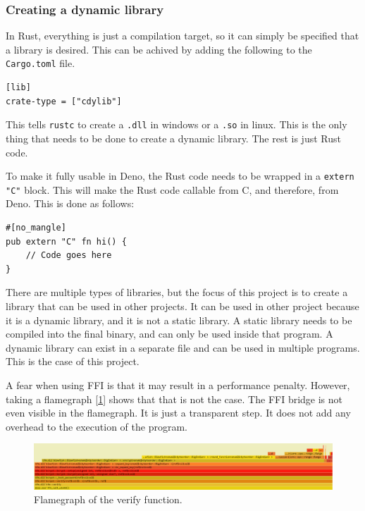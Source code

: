 \documentclass[10pt,journal,compsoc]{IEEEtran}
\begin{document}
\subsubsection{Creating a dynamic library}

In Rust, everything is just a compilation target, so it can simply be specified that a library is desired. This can be achived by adding the following to the \verb|Cargo.toml| file.

\begin{lstlisting}
[lib]
crate-type = ["cdylib"]
\end{lstlisting}

This tells \verb|rustc| to create a \verb|.dll| in windows or a \verb|.so| in linux. This is the only thing that needs to be done to create a dynamic library. The rest is just Rust code.

To make it fully usable in Deno, the Rust code needs to be wrapped in a \verb|extern "C"| block. This will make the Rust code callable from C, and therefore, from Deno. This is done as follows:

\begin{lstlisting}
#[no_mangle]
pub extern "C" fn hi() {
    // Code goes here
}
\end{lstlisting}

There are multiple types of libraries, but the focus of this project is to create a library that can be used in other projects. It can be used in other project because it is a dynamic library, and it is not a static library. A static library needs to be compiled into the final binary, and can only be used inside that program. A dynamic library can exist in a separate file and can be used in multiple programs. This is the case of this project.

A fear when using FFI is that it may result in a performance penalty. However, taking a flamegraph [\ref{img:flamegraph}] shows that that is not the case. The FFI bridge is not even visible in the flamegraph. It is just a transparent step. It does not add any overhead to the execution of the program.

\begin{figure}
    \centering
    \includegraphics[width=\textwidth]{flamegraph}
    \caption{Flamegraph of the verify function.}
    \label{img:flamegraph}
\end{figure}
\end{document}
